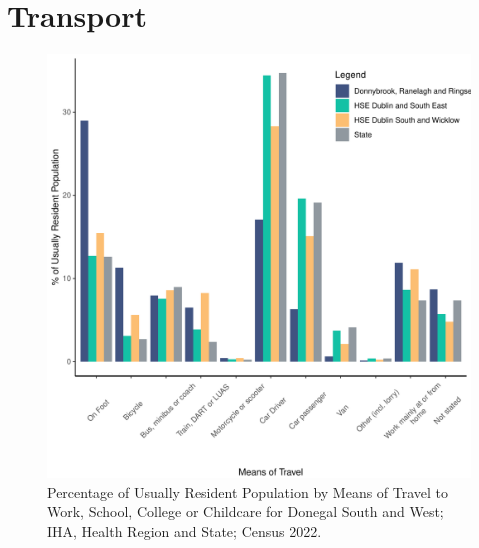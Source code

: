 \documentclass{article}
\begin{document}
\section{Transport}\label{sect:Trans}
\begin{figure}[H]
	\centering
	\includegraphics[width = 120mm]{../figures/TravelED.pdf}
	\caption{Percentage of Usually Resident Population by Means of Travel to Work, School, College or Childcare for Donegal South and West; IHA, Health Region and State; Census 2022.}
	\label{fig:vbnv}
	\end{figure}
\end{document}
